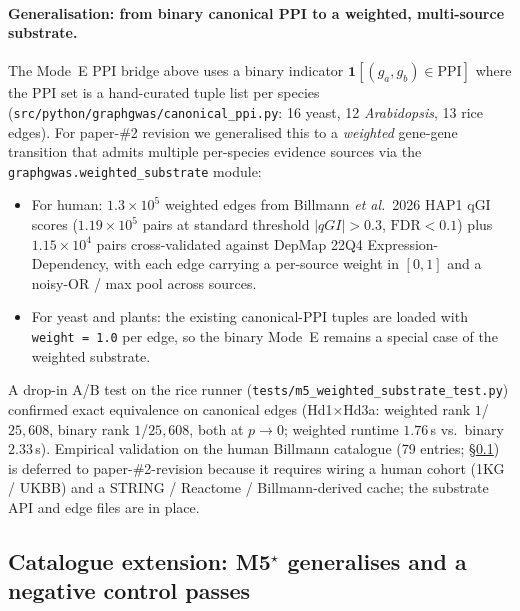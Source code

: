 \paragraph{Generalisation: from binary canonical PPI to a weighted,
multi-source substrate.}
The Mode~E PPI bridge above uses a binary indicator
$\mathbf 1[(g_a,g_b)\in\mathrm{PPI}]$ where the PPI set is a
hand-curated tuple list per species
(\texttt{src/python/graphgwas/canonical\_ppi.py}: 16 yeast, 12
\emph{Arabidopsis}, 13 rice edges). For paper-\#2 revision we
generalised this to a \emph{weighted} gene-gene transition that
admits multiple per-species evidence sources via the
\texttt{graphgwas.weighted\_substrate} module:
\begin{itemize}\setlength{\itemsep}{0pt}
\item For human: $1.3 \times 10^5$ weighted edges from
      Billmann \emph{et al.}\ 2026 \cite{billmann2026hap1}
      HAP1 qGI scores ($1.19 \times 10^5$ pairs at standard threshold
      $|qGI|>0.3$, $\mathrm{FDR}<0.1$) plus
      $1.15 \times 10^4$ pairs cross-validated against DepMap 22Q4
      Expression-Dependency, with each edge carrying a per-source
      weight in $[0,1]$ and a noisy-OR / max pool across sources.
\item For yeast and plants: the existing canonical-PPI tuples are
      loaded with \texttt{weight = 1.0} per edge, so the binary
      Mode~E remains a special case of the weighted substrate.
\end{itemize}
A drop-in A/B test on the rice runner (\texttt{tests/m5\_weighted\_substrate\_test.py})
confirmed exact equivalence on canonical edges (Hd1$\times$Hd3a:
weighted rank $1$/$25{,}608$, binary rank $1$/$25{,}608$, both at
$p\to 0$; weighted runtime $1.76\,$s vs.\ binary $2.33\,$s).
Empirical validation on the human Billmann catalogue (79 entries;
§\ref{sec:catalogue_extension}) is deferred to paper-\#2-revision
because it requires wiring a human cohort (1KG / UKBB) and a STRING /
Reactome / Billmann-derived cache; the substrate API and edge files
are in place.

\subsection{Catalogue extension: M5$^\star$ generalises and a negative
control passes}\label{sec:catalogue_extension}

